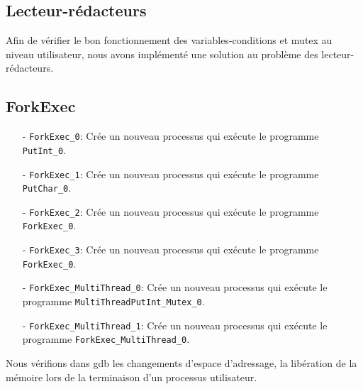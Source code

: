 \documentclass[11pt]{article}
\theoremstyle{definition}
\theoremstyle{definition}
\begin{document}
\subsection{Lecteur-rédacteurs}

Afin de vérifier le bon fonctionnement des variables-conditions et mutex
au niveau utilisateur, nous avons implémenté une solution au problème des
lecteur-rédacteurs.

\subsection{ForkExec}
\begin{itemize}
\item[-] \texttt{ForkExec\_0}: Crée un nouveau processus qui exécute le programme \texttt{PutInt\_0}.
\item[-] \texttt{ForkExec\_1}: Crée un nouveau processus qui exécute le programme \texttt{PutChar\_0}.
\item[-] \texttt{ForkExec\_2}: Crée un nouveau processus qui exécute le programme \texttt{ForkExec\_0}.
\item[-] \texttt{ForkExec\_3}: Crée un nouveau processus qui exécute le programme \texttt{ForkExec\_0}.
\item[-] \texttt{ForkExec\_MultiThread\_0}: Crée un nouveau processus qui exécute le programme \texttt{MultiThreadPutInt\_Mutex\_0}.
\item[-] \texttt{ForkExec\_MultiThread\_1}: Crée un nouveau processus qui exécute le programme \texttt{ForkExec\_MultiThread\_0}.
\end{itemize}
Nous vérifions dans gdb les changements d'espace d'adressage, la libération de la mémoire lors de la terminaison d'un processus utilisateur.
\end{document}
